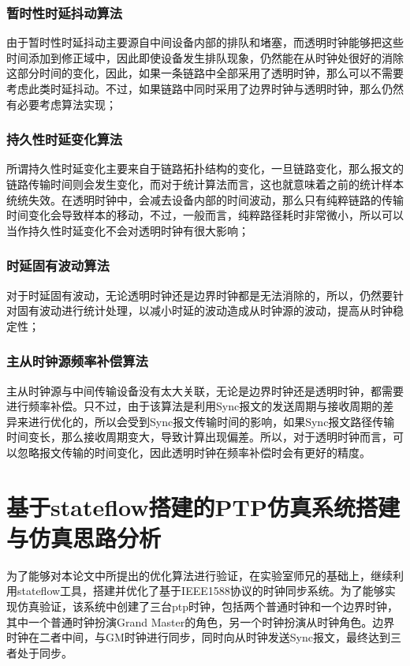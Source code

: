 \subsubsection{暂时性时延抖动算法}
由于暂时性时延抖动主要源自中间设备内部的排队和堵塞，而透明时钟能够把这些时间添加到修正域中，因此即使设备发生排队现象，仍然能在从时钟处很好的消除这部分时间的变化，因此，如果一条链路中全部采用了透明时钟，那么可以不需要考虑此类时延抖动。不过，如果链路中同时采用了边界时钟与透明时钟，那么仍然有必要考虑算法实现；

\subsubsection{持久性时延变化算法}
所谓持久性时延变化主要来自于链路拓扑结构的变化，一旦链路变化，那么报文的链路传输时间则会发生变化，而对于统计算法而言，这也就意味着之前的统计样本统统失效。在透明时钟中，会减去设备内部的时间波动，那么只有纯粹链路的传输时间变化会导致样本的移动，不过，一般而言，纯粹路径耗时非常微小，所以可以当作持久性时延变化不会对透明时钟有很大影响；

\subsubsection{时延固有波动算法}
对于时延固有波动，无论透明时钟还是边界时钟都是无法消除的，所以，仍然要针对固有波动进行统计处理，以减小时延的波动造成从时钟源的波动，提高从时钟稳定性；

\subsubsection{主从时钟源频率补偿算法}
主从时钟源与中间传输设备没有太大关联，无论是边界时钟还是透明时钟，都需要进行频率补偿。只不过，由于该算法是利用Sync报文的发送周期与接收周期的差异来进行优化的，所以会受到Sync报文传输时间的影响，如果Sync报文路径传输时间变长，那么接收周期变大，导致计算出现偏差。所以，对于透明时钟而言，可以忽略报文传输的时间变化，因此透明时钟在频率补偿时会有更好的精度。

\section{基于stateflow搭建的PTP仿真系统搭建与仿真思路分析}
为了能够对本论文中所提出的优化算法进行验证，在实验室师兄的基础上，继续利用stateflow工具，搭建并优化了基于IEEE1588协议的时钟同步系统。为了能够实现仿真验证，该系统中创建了三台ptp时钟，包括两个普通时钟和一个边界时钟，其中一个普通时钟扮演Grand Master的角色，另一个时钟扮演从时钟角色。边界时钟在二者中间，与GM时钟进行同步，同时向从时钟发送Sync报文，最终达到三者处于同步。

